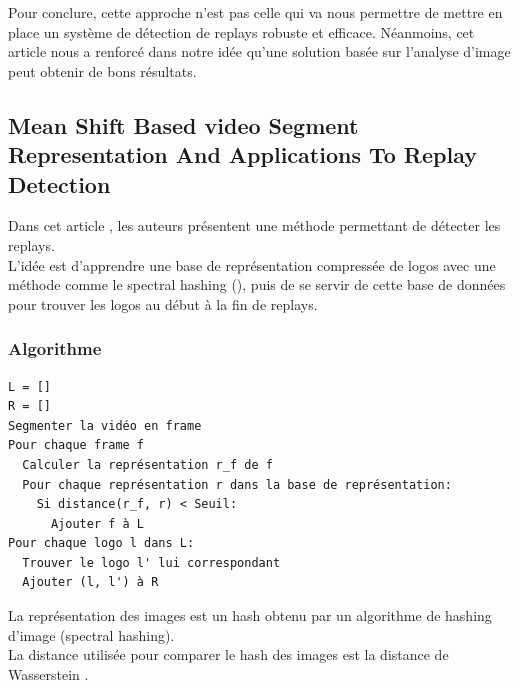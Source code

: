 \documentclass[11pt]{article}
\begin{document}
Pour conclure, cette approche n'est pas celle qui va nous permettre de mettre en place un système de détection de replays robuste et efficace. Néanmoins, cet article nous a renforcé dans notre idée qu'une solution basée sur l'analyse d'image peut obtenir de bons résultats.\\

\subsection{Mean Shift Based video Segment Representation And Applications To Replay Detection}
\label{sec:orgb3851d0}
Dans cet article \cite{Ling_Yu_Duan}, les auteurs présentent une méthode permettant de détecter les replays.\\
L'idée est d'apprendre une base de représentation compressée de logos avec une méthode comme le spectral hashing (\cite{NIPS2008_3383}), puis de se servir de cette base de données pour trouver les logos au début à la fin de replays.\\
\subsubsection{Algorithme}
\label{sec:org3a9674e}
\begin{verbatim}
L = []
R = []
Segmenter la vidéo en frame
Pour chaque frame f
  Calculer la représentation r_f de f
  Pour chaque représentation r dans la base de représentation:
    Si distance(r_f, r) < Seuil:
      Ajouter f à L
Pour chaque logo l dans L:
  Trouver le logo l' lui correspondant
  Ajouter (l, l') à R
\end{verbatim}
La représentation des images est un hash obtenu par un algorithme de hashing d'image (spectral hashing).\\
La distance utilisée pour comparer le hash des images est la distance de Wasserstein .\\
\end{document}
